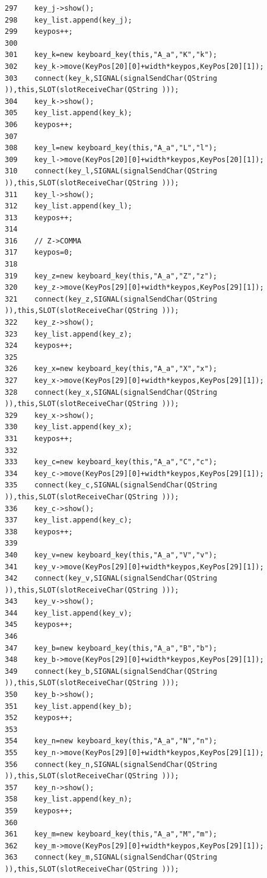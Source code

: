 \begin{verbatim}
297    key_j->show();
298    key_list.append(key_j);
299    keypos++;
300    
301    key_k=new keyboard_key(this,"A_a","K","k");
302    key_k->move(KeyPos[20][0]+width*keypos,KeyPos[20][1]);
303    connect(key_k,SIGNAL(signalSendChar(QString )),this,SLOT(slotReceiveChar(QString )));
304    key_k->show();
305    key_list.append(key_k);
306    keypos++;
307    
308    key_l=new keyboard_key(this,"A_a","L","l");
309    key_l->move(KeyPos[20][0]+width*keypos,KeyPos[20][1]);
310    connect(key_l,SIGNAL(signalSendChar(QString )),this,SLOT(slotReceiveChar(QString )));
311    key_l->show();
312    key_list.append(key_l);
313    keypos++;
314    
316    // Z->COMMA
317    keypos=0;
318    
319    key_z=new keyboard_key(this,"A_a","Z","z");
320    key_z->move(KeyPos[29][0]+width*keypos,KeyPos[29][1]);
321    connect(key_z,SIGNAL(signalSendChar(QString )),this,SLOT(slotReceiveChar(QString )));
322    key_z->show();
323    key_list.append(key_z);
324    keypos++;
325    
326    key_x=new keyboard_key(this,"A_a","X","x");
327    key_x->move(KeyPos[29][0]+width*keypos,KeyPos[29][1]);
328    connect(key_x,SIGNAL(signalSendChar(QString )),this,SLOT(slotReceiveChar(QString )));
329    key_x->show();
330    key_list.append(key_x);
331    keypos++;
332    
333    key_c=new keyboard_key(this,"A_a","C","c");
334    key_c->move(KeyPos[29][0]+width*keypos,KeyPos[29][1]);
335    connect(key_c,SIGNAL(signalSendChar(QString )),this,SLOT(slotReceiveChar(QString )));
336    key_c->show();
337    key_list.append(key_c);
338    keypos++;
339    
340    key_v=new keyboard_key(this,"A_a","V","v");
341    key_v->move(KeyPos[29][0]+width*keypos,KeyPos[29][1]);
342    connect(key_v,SIGNAL(signalSendChar(QString )),this,SLOT(slotReceiveChar(QString )));
343    key_v->show();
344    key_list.append(key_v);
345    keypos++;
346    
347    key_b=new keyboard_key(this,"A_a","B","b");
348    key_b->move(KeyPos[29][0]+width*keypos,KeyPos[29][1]);
349    connect(key_b,SIGNAL(signalSendChar(QString )),this,SLOT(slotReceiveChar(QString )));
350    key_b->show();
351    key_list.append(key_b);
352    keypos++;
353    
354    key_n=new keyboard_key(this,"A_a","N","n");
355    key_n->move(KeyPos[29][0]+width*keypos,KeyPos[29][1]);
356    connect(key_n,SIGNAL(signalSendChar(QString )),this,SLOT(slotReceiveChar(QString )));
357    key_n->show();
358    key_list.append(key_n);
359    keypos++;
360    
361    key_m=new keyboard_key(this,"A_a","M","m");
362    key_m->move(KeyPos[29][0]+width*keypos,KeyPos[29][1]);
363    connect(key_m,SIGNAL(signalSendChar(QString )),this,SLOT(slotReceiveChar(QString )));

\end{verbatim}
